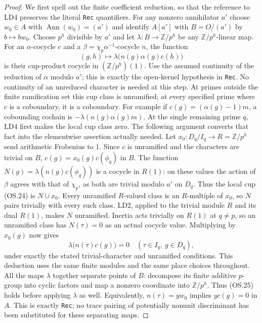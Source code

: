 \begin{proof}
We first spell out the finite coefficient reduction, so that the
reference to LD4 preserves the literal \texttt{Rec} quantifiers.
For any nonzero annihilator $a'$ choose $w_0\in A$ with
$\operatorname{Ann}(w_0)=(a')$ and identify $A[a']$ with
$B=O/(a')$ by $b\mapsto bw_0$.
Choose $p^h$ divisible by $a'$ and let
$\lambda:B\to\mathbb Z/p^h$ be any
$\mathbb Z/p^h$-linear map.
For an $\alpha$-cocycle $c$ and a
$\beta=\chi_p\alpha^{-1}$-cocycle $n$, the function
\[
             (g,h)\longmapsto
                 \lambda\bigl(n(g)\alpha(g)c(h)\bigr)
 \tag{OS.24}
\]
is their cup-product cocycle in $(\mathbb Z/p^h)(1)$.
Use the assumed continuity of the reduction of $\alpha$ modulo $a'$;
this is exactly the open-kernel hypothesis in \texttt{Rec}.
No continuity of an unreduced character is needed at this step.
At primes outside the finite ramification
set this cup class is unramified; at every specified prime where
$c$ is a coboundary, it is a coboundary.  For example if
$c(g)=(\alpha(g)-1)m$, a cobounding cochain is
$-\lambda(n(g)\alpha(g)m)$.
At the single remaining prime $q$, LD4 first makes the local cup
class zero.  The following argument converts that fact into the
elementwise assertion actually needed.  Let
$x_0:D_q/I_q\to R=\mathbb Z/p^h$ send arithmetic Frobenius to $1$.
Since $c$ is unramified and the characters are trivial on $B$,
$c(g)=x_0(g)c(\phi_q)$ in $B$.
The function $N(g)=\lambda(n(g)c(\phi_q))$ is a cocycle in $R(1)$:
on these values the action of $\beta$ agrees with that of $\chi_p$,
as both are trivial modulo $a'$ on $D_q$.
Thus the local cup (OS.24) is $N\cup x_0$.
Every unramified $R$-valued class is an $R$-multiple of $x_0$,
so $N$ pairs trivially with every such class.
LD2, applied to the trivial module $R$ and its dual $R(1)$, makes
$N$ unramified.  Inertia acts trivially on $R(1)$ at $q\ne p$,
so an unramified class has $N(\tau)=0$ as an actual cocycle value.
Multiplying by $x_0(g)$ now gives
\[
                  \lambda\bigl(n(\tau)c(g)\bigr)=0
                 \quad(\tau\in I_q,\ g\in D_q),
 \tag{OS.25}
\]
under exactly the stated trivial-character and unramified conditions.
This deduction uses the same finite modules and the same place choices
throughout.
All the maps $\lambda$ together separate points of $B$:
decompose its finite additive $p$-group into cyclic factors and
map a nonzero coordinate into $\mathbb Z/p^h$.
Thus (OS.25) holds before applying $\lambda$ as well.
Equivalently, $n(\tau)=yw_0$ implies $y c(g)=0$ in $A$.
This is exactly \texttt{Rec}; no trace pairing of potentially
nonunit discriminant has been substituted for these separating maps.


\end{proof}
